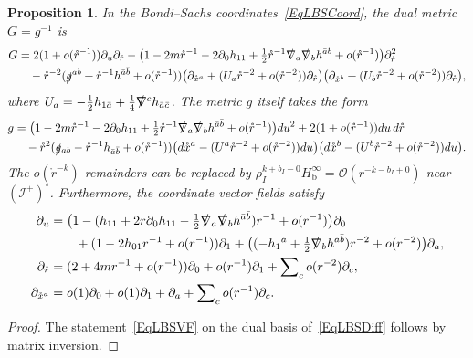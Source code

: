\documentclass[reqno,11pt,letterpaper]{amsart}
\numberwithin{equation}{section}
\numberwithin{figure}{section}
\newtheorem{prop}[thm]{Proposition}
\theoremstyle{definition}
\theoremstyle{remark}
\newcommand{\mc}{\mathcal}
\newcommand{\cO}{\mc O}
\newcommand{\ms}{\mathscr}
\newcommand{\scri}{\ms I}
\newcommand{\slg}{\slashed{g}{}}
\newcommand{\slnabla}{\slashed{\nabla}{}}
\newcommand{\pa}{\partial}
\newcommand{\bop}{{\mathrm{b}}}
\newcommand{\half}{\tfrac{1}{2}}
\newcommand{\Hb}{H_{\bop}}
\begin{document}
\begin{prop}
\label{PropLBS}
  In the Bondi--Sachs coordinates~\eqref{EqLBSCoord}, the dual metric $G=g^{-1}$ is
  \begin{align*}
    G &= 2(1+o(\mathring r^{-1}))\pa_u\pa_{\mathring r} - \bigl(1-2 m\mathring r^{-1}-2\pa_0 h_{1 1}+\half\mathring r^{-1}\slnabla_a\slnabla_b h^{\bar a\bar b}+o(\mathring r^{-1})\bigr)\pa_{\mathring r}^2 \\
      &\quad - \mathring r^{-2}(\slg^{a b}+\mathring r^{-1}h^{\bar a\bar b}+o(\mathring r^{-1}))\bigl(\pa_{\mathring x^a}+(U_a\mathring r^{-2}+o(\mathring r^{-2}))\pa_{\mathring r}\bigr)\bigl(\pa_{\mathring x^b}+(U_b\mathring r^{-2}+o(\mathring r^{-2}))\pa_{\mathring r}\bigr),
  \end{align*}
  where $U_a=-\half h_{1\bar a}+\tfrac14 \slnabla^c h_{\bar a\bar c}$. The metric $g$ itself takes the form
  \begin{align*}
    g &= \bigl(1-2 m\mathring r^{-1}-2\pa_0 h_{1 1}+\half\mathring r^{-1}\slnabla_a\slnabla_b h^{\bar a\bar b}+o(\mathring r^{-1})\bigr)d u^2 + 2(1+o(\mathring r^{-1}))d u\,d\mathring r \\
      &\quad - \mathring r^2(\slg_{a b}-\mathring r^{-1}h_{\bar a\bar b}+o(\mathring r^{-1}))\bigl(d\mathring x^a-(U^a\mathring r^{-2}+o(\mathring r^{-2}))d u\bigr)\bigl(d\mathring x^b-(U^b\mathring r^{-2}+o(\mathring r^{-2}))d u\bigr).
  \end{align*}
  The $o(\mathring r^{-k})$ remainders can be replaced by $\rho_I^{k+b_I-0}\Hb^\infty=\cO(r^{-k-b_I+0})$ near $(\scri^+)^\circ$. Furthermore, the coordinate vector fields satisfy
  \begin{equation}
  \label{EqLBSVF}
  \begin{split}
    \pa_u &= \bigl(1-(h_{1 1}+2 r\pa_0 h_{1 1}-\half\slnabla_a\slnabla_b h^{\bar a\bar b})r^{-1}+o(r^{-1})\bigr)\pa_0 \\
      &\qquad + (1-2 h_{0 1}r^{-1}+o(r^{-1}))\pa_1 + \bigl((-h_1{}^{\bar a}+\half\slnabla_b h^{\bar a\bar b})r^{-2}+o(r^{-2})\bigr)\pa_a, \\
    \pa_{\mathring r} &= (2+4 m r^{-1}+o(r^{-1}))\pa_0 + o(r^{-1})\pa_1 + \sum\nolimits_c o(r^{-2})\pa_c, \\
    \pa_{\mathring x^a} &= o(1)\pa_0 + o(1)\pa_1 + \pa_a + \sum\nolimits_c o(r^{-1})\pa_c.
  \end{split}
  \end{equation}
\end{prop}
\begin{proof}
  The statement~\eqref{EqLBSVF} on the dual basis of~\eqref{EqLBSDiff} follows by matrix inversion.
\end{proof}
\end{document}

